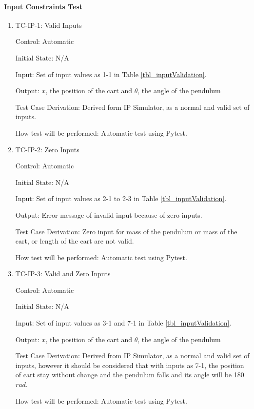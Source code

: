 \documentclass[12pt, titlepage]{article}
\begin{document}
 
\paragraph{Input Constraints Test}

\begin{enumerate}

\item{TC-IP-1: Valid Inputs}

Control: Automatic
					
Initial State: N/A 
					
Input: Set of input values as 1-1 in Table \ref{tbl_inputValidation}.
					
Output: $x$, the position of the cart and $\theta$, the angle of the pendulum

Test Case Derivation: Derived form IP Simulator, as a normal and valid set of inputs.
					
How test will be performed: Automatic test using Pytest.

\item{TC-IP-2: Zero Inputs}

Control: Automatic
					
Initial State: N/A 
					
Input: Set of input values as 2-1 to 2-3 in Table \ref{tbl_inputValidation}.
					
Output: Error message of invalid input because of zero inputs.

Test Case Derivation: Zero input for mass of the pendulum or mass of the cart, or length of the cart are not valid.
					
How test will be performed: Automatic test using Pytest.

\item{TC-IP-3: Valid and Zero Inputs}

Control: Automatic
					
Initial State: N/A 
					
Input: Set of input values as 3-1  and 7-1 in Table \ref{tbl_inputValidation}.
					
Output: $x$, the position of the cart and $\theta$, the angle of the pendulum

Test Case Derivation: Derived from IP Simulator, as a normal and valid set of inputs, however it should be considered that with inputs as 7-1, the position of cart stay without change and the pendulum falls and its angle will be 180 $rad$.
					
How test will be performed: Automatic test using Pytest.


\end{enumerate}
\end{document}
